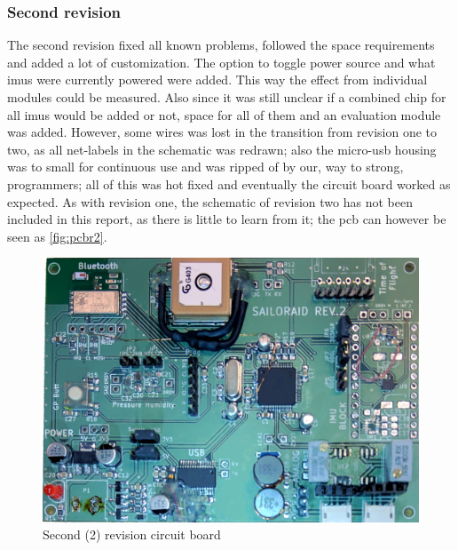 \subsubsection{Second revision}
The second revision fixed all known problems, followed the space requirements and added a lot of customization. The option to toggle power source and what \gls{imu}s were currently powered were added. This way the effect from individual modules could be measured. Also since it was still unclear if a combined chip for all \gls{imu}s would be added or not, space for all of them and an evaluation module was added. However, some wires was lost in the transition from revision one to two, as all net-labels in the schematic was redrawn; also the micro-\gls{usb} housing was to small for continuous use and was ripped of by our, way to strong, programmers; all of this was hot fixed and eventually the circuit board worked as expected. As with revision one, the schematic of revision two has not been included in this report, as there is little to learn from it; the \gls{pcb} can however be seen as \autoref{fig:pcbr2}.
\begin{figure}[tbh]
	\centering
	\includegraphics[width=\linewidth]{Figures/pcb_rev2.jpg}
	\caption{Second (2) revision circuit board}
	\label{fig:pcbr2}
\end{figure}

